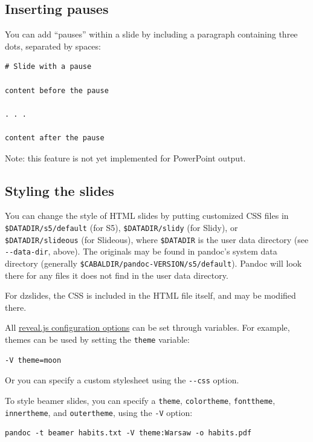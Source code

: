 \documentclass[
]{article}
\begin{document}
\hypertarget{inserting-pauses}{%
\subsection{Inserting pauses}\label{inserting-pauses}}

You can add ``pauses'' within a slide by including a paragraph
containing three dots, separated by spaces:

\begin{verbatim}
# Slide with a pause

content before the pause

. . .

content after the pause
\end{verbatim}

Note: this feature is not yet implemented for PowerPoint output.

\hypertarget{styling-the-slides}{%
\subsection{Styling the slides}\label{styling-the-slides}}

You can change the style of HTML slides by putting customized CSS files
in \texttt{\$DATADIR/s5/default} (for S5), \texttt{\$DATADIR/slidy} (for
Slidy), or \texttt{\$DATADIR/slideous} (for Slideous), where
\texttt{\$DATADIR} is the user data directory (see
\texttt{-\/-data-dir}, above). The originals may be found in pandoc's
system data directory (generally
\texttt{\$CABALDIR/pandoc-VERSION/s5/default}). Pandoc will look there
for any files it does not find in the user data directory.

For dzslides, the CSS is included in the HTML file itself, and may be
modified there.

All \href{https://revealjs.com/config/}{reveal.js configuration options}
can be set through variables. For example, themes can be used by setting
the \texttt{theme} variable:

\begin{verbatim}
-V theme=moon
\end{verbatim}

Or you can specify a custom stylesheet using the \texttt{-\/-css}
option.

To style beamer slides, you can specify a \texttt{theme},
\texttt{colortheme}, \texttt{fonttheme}, \texttt{innertheme}, and
\texttt{outertheme}, using the \texttt{-V} option:

\begin{verbatim}
pandoc -t beamer habits.txt -V theme:Warsaw -o habits.pdf
\end{verbatim}
\end{document}
